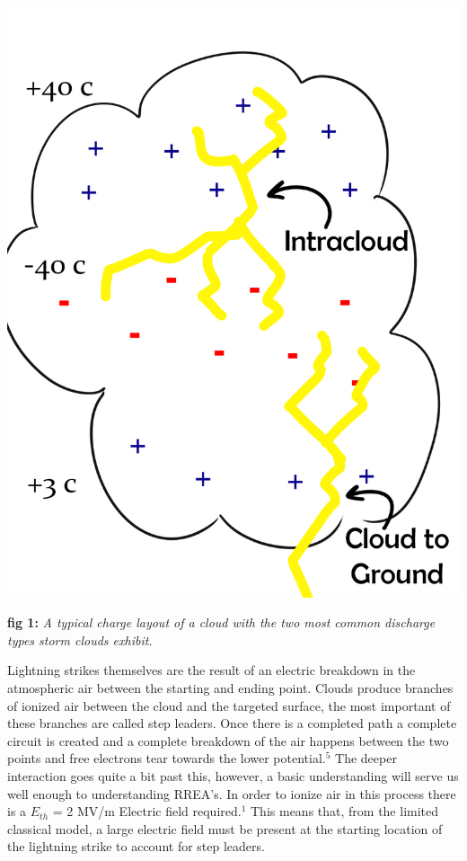 \documentclass[11pt]{article}
\begin{document}
\begin{multicols*}{2}
    \begin{center}
        \includegraphics[width=.9\linewidth]{clouds.png}
    \end{center}
    \textbf{fig 1:} \textit{A typical charge layout of a cloud with the two most common discharge types storm clouds exhibit.}


    Lightning strikes themselves are the result of an electric breakdown in the atmospheric air between the starting and ending point. Clouds produce branches of ionized air between the cloud and the targeted surface, the most important of these branches are called step leaders. Once there is a completed path a complete circuit is created and a complete breakdown of the air happens between the two points and free electrons tear towards the lower potential.$^{5}$ The deeper interaction goes quite a bit past this, however, a basic understanding will serve us well enough to understanding RREA's. In order to ionize air in this process there is a $E_{th}$ = 2 MV/m Electric field required.${^1}$ This means that, from the limited classical model, a large electric field must be present at the starting location of the lightning strike to account for step leaders. 
    \newline
    


\end{multicols*}
\end{document}
